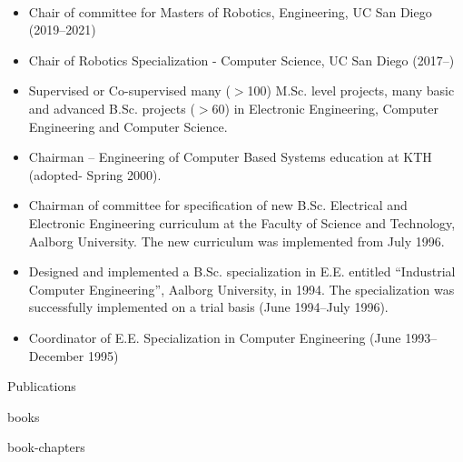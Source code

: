 \documentclass{article}
\begin{document}
\begin{cv}
\begin{cvlist}{~}
\item[Other Teaching Activities]
  \begin{itemize}
  \item Chair of committee for Masters of Robotics, Engineering, 
    UC San Diego (2019--2021)

  \item Chair of Robotics Specialization - Computer Science, UC San
    Diego (2017--)

  \item Supervised or Co-supervised many ($>$100) M.Sc. level projects,
    many basic and advanced B.Sc. projects ($>$60) in Electronic
    Engineering, Computer Engineering and Computer Science.

  \item Chairman -- Engineering of Computer Based Systems education at
    KTH (adopted- Spring 2000).

  \item Chairman of committee for specification of new B.Sc. Electrical
    and Electronic Engineering curriculum at the Faculty of Science and
    Technology, Aalborg University.  The new curriculum was implemented
    from July 1996.

  \item Designed and implemented a B.Sc. specialization in E.E.
    entitled ``Industrial Computer Engineering'', Aalborg University, in
    1994.  The specialization was successfully implemented on a trial
    basis (June 1994--July 1996).

  \item Coordinator of E.E. Specialization in Computer Engineering (June
    1993--December 1995)
\end{itemize}
\end{cvlist}



\begin{cvlist}{Publications}
\item[Books]
  \begin{btSect}{books}
    \btPrintAll
  \end{btSect}

\item[Book Chapters]
  \begin{btSect}{book-chapters}
    \btPrintAll
  \end{btSect}


\end{cvlist}
\end{cv}
\end{document}
